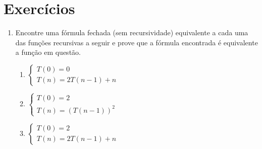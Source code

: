 \section{Exercícios}
\begin{enumerate}
	\item Encontre uma f\'ormula fechada (sem recursividade) equivalente a cada uma das fun\c{c}\~oes recursivas a seguir
		  e prove que a f\'ormula encontrada \'e equivalente a fun\c{c}\~ao em quest\~ao.
	\begin{enumerate}
		\item
				$\left\{
					\begin{array}{l}
						T(0) = 0 \\
						T(n) = 2T(n - 1) + n
					\end{array}
			    \right .$

		\item
				$\left\{
					\begin{array}{l}
						T(0) = 2 \\
						T(n) = (T(n - 1))^{2}
					\end{array}
			    \right .$

		\item
				$\left\{
					\begin{array}{l}
						T(0) = 2 \\
						T(n) = 2T(n - 1) + n
					\end{array}
			    \right .$


\end{enumerate}
\end{enumerate}
